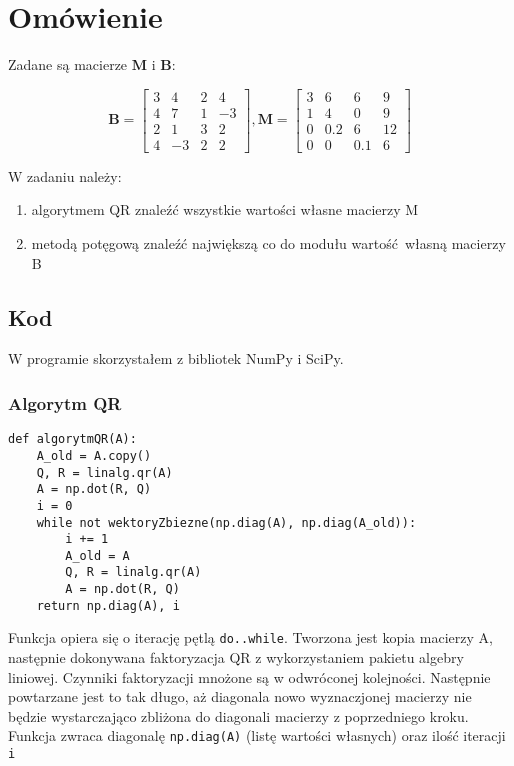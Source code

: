 \documentclass[a4paper,11pt]{article}
\begin{document}
\pagebreak

\section{Omówienie}

Zadane są macierze \(\mathbf{M}\) i \(\mathbf{B}\):

\[
\mathbf{B} = 
\begin{bmatrix}
    3 & 4 & 2 & 4 \\
    4 & 7 & 1 & -3 \\
    2 & 1 & 3 & 2 \\
    4 & -3 & 2 & 2
\end{bmatrix},
\mathbf{M} = 
\begin{bmatrix}
    3 & 6 & 6 & 9 \\
    1 & 4 & 0 & 9 \\
    0 & 0.2 & 6 & 12 \\
    0 & 0 & 0.1 & 6
\end{bmatrix}
\]

W zadaniu należy:
\begin{enumerate}[label=\alph*)]
    \item algorytmem QR znaleźć wszystkie wartości własne macierzy M
    \item metodą potęgową znaleźć największą co do modułu wartość własną 
    macierzy B
\end{enumerate}

\subsection{Kod}

W programie skorzystałem z bibliotek NumPy i SciPy.

\subsubsection{Algorytm QR}

\begin{lstlisting}[caption={Algorytm QR}]
def algorytmQR(A):
    A_old = A.copy()
    Q, R = linalg.qr(A)
    A = np.dot(R, Q)
    i = 0
    while not wektoryZbiezne(np.diag(A), np.diag(A_old)):
        i += 1
        A_old = A
        Q, R = linalg.qr(A)
        A = np.dot(R, Q)
    return np.diag(A), i
\end{lstlisting}

Funkcja opiera się o iterację pętlą \texttt{do..while}. Tworzona jest kopia
macierzy A, następnie dokonywana faktoryzacja QR z wykorzystaniem pakietu
algebry liniowej. Czynniki faktoryzacji mnożone są w odwróconej kolejności.
Następnie powtarzane jest to tak długo, aż diagonala nowo wyznaczjonej macierzy
nie będzie wystarczająco zbliżona do diagonali macierzy z poprzedniego kroku.
Funkcja zwraca diagonalę \texttt{np.diag(A)} (listę wartości własnych) oraz ilość
iteracji \texttt{i}
\end{document}
